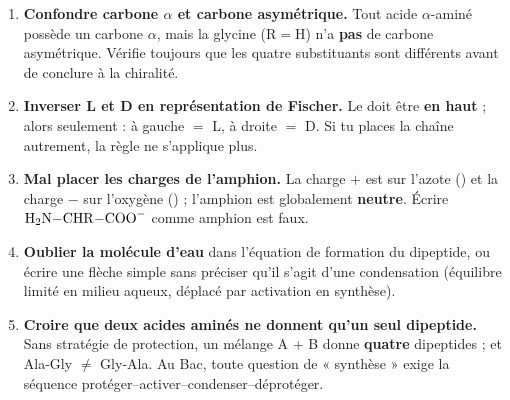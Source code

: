 \documentclass[11pt]{article}
\begin{document}
\begin{attention}
\begin{enumerate}
\item \textbf{Confondre carbone $\alpha$ et carbone asymétrique.} Tout acide $\alpha$-aminé possède un carbone $\alpha$, mais la glycine ($\mathrm{R} = \mathrm{H}$) n'a \textbf{pas} de carbone asymétrique. Vérifie toujours que les quatre substituants sont différents avant de conclure à la chiralité.
\item \textbf{Inverser L et D en représentation de Fischer.} Le  doit être \textbf{en haut} ; alors seulement :  à gauche $=$ L, à droite $=$ D. Si tu places la chaîne autrement, la règle ne s'applique plus.
\item \textbf{Mal placer les charges de l'amphion.} La charge $+$ est sur l'azote () et la charge $-$ sur l'oxygène () ; l'amphion est globalement \textbf{neutre}. Écrire $\ce{H2N-CHR-COO^-}$ comme amphion est faux.
\item \textbf{Oublier la molécule d'eau} dans l'équation de formation du dipeptide, ou écrire une flèche simple sans préciser qu'il s'agit d'une condensation (équilibre limité en milieu aqueux, déplacé par activation en synthèse).
\item \textbf{Croire que deux acides aminés ne donnent qu'un seul dipeptide.} Sans stratégie de protection, un mélange A + B donne \textbf{quatre} dipeptides ; et Ala-Gly $\neq$ Gly-Ala. Au Bac, toute question de « synthèse » exige la séquence protéger--activer--condenser--déprotéger.
\end{enumerate}
\end{attention}
\end{document}
